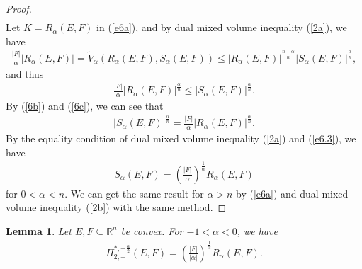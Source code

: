 \documentclass[preprint,12pt]{elsarticle}
\newtheorem{lem}{Lemma}
\begin{document}
\begin{proof}
\begin{eqnarray}
\end{eqnarray} 
Let $K={R}_{\alpha }(E,F)$ in (\ref{e6a}), and by dual mixed volume inequality (\ref{2a}), we have
\begin{eqnarray*}
\frac{|F|}{\alpha }|{R}_{\alpha }(E,F)|=\widetilde{V}_{\alpha} ({R}_{\alpha }(E,F),{S}_{\alpha }(E,F))\le |{R}_{\alpha }(E,F)|^{\frac{n-\alpha}{n}}|{S}_{\alpha }(E,F)|^{\frac{\alpha}{n}},
\end{eqnarray*} 
and thus
\begin{eqnarray}\label{6c}
\frac{|F|}{\alpha }|{R}_{\alpha }(E,F)|^{\frac{\alpha}{n}} \le |{S}_{\alpha }(E,F)|^{\frac{\alpha}{n}}.
\end{eqnarray} 
By (\ref{6b}) and (\ref{6c}), we can see that
\begin{eqnarray}\label{e6.3}
|{S}_{\alpha }(E,F)|^{\frac{\alpha}{n}}=\frac{|F|}{\alpha }|{R}_{\alpha }(E,F)|^{\frac{\alpha}{n}}.
\end{eqnarray}
By the equality condition of dual mixed volume inequality (\ref{2a}) and (\ref{e6.3}), we have
\begin{eqnarray}\label{6d}
{S}_{\alpha }(E,F)=\left(\frac{|F|}{\alpha }\right)^{\frac{1}{\alpha}}{R}_{\alpha }(E,F)
\end{eqnarray} 
for $0<\alpha <n$. We can get the same result for $\alpha >n$ by (\ref{e6a}) and dual mixed volume inequality (\ref{2b}) with the same method.
\end{proof}
\begin{lem}\label{L6.2}
Let $E,F \subseteq \mathbb{R}^n$ be convex. For $-1<\alpha<0$, 
we have
\begin{eqnarray}\label{6.12}
{\Pi }_{2,-}^{*,-\frac{\alpha }{2} }(E,F)=\left(\frac{|F|}{|\alpha| }\right)^{\frac{1}{\alpha}}{R}_{\alpha }(E,F).
\end{eqnarray}
\end{lem}
\end{document}
